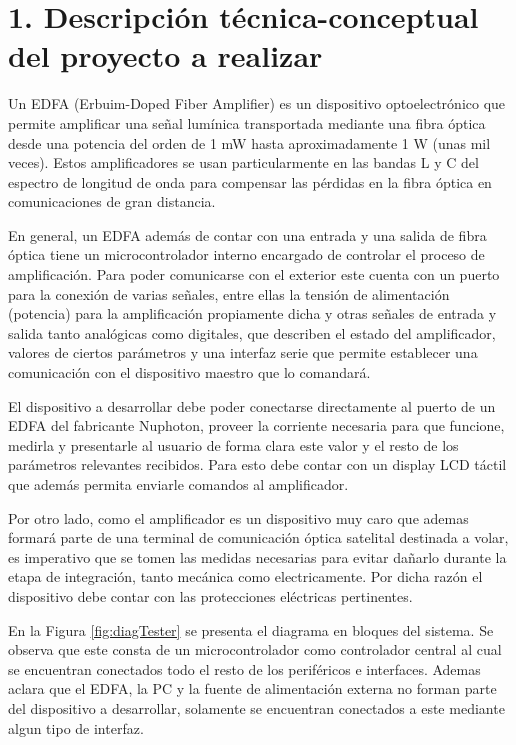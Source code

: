 \documentclass[
11pt, %
]{charter}
\begin{document}
\section{1. Descripción técnica-conceptual del proyecto a realizar}
\label{sec:descripcion}

Un EDFA (Erbuim-Doped Fiber Amplifier) es un dispositivo optoelectrónico que permite amplificar una señal lumínica transportada mediante una fibra óptica desde una potencia del orden de 1 mW hasta aproximadamente 1 W (unas mil veces). Estos amplificadores se usan particularmente en las bandas L y C del espectro de longitud de onda para compensar las pérdidas en la fibra óptica en comunicaciones de gran distancia.

En general, un EDFA además de contar con una entrada y una salida de fibra óptica tiene un microcontrolador interno encargado de controlar el proceso de amplificación. Para poder comunicarse con el exterior este cuenta con un puerto para la conexión de varias señales, entre ellas la tensión de alimentación (potencia) para la amplificación propiamente dicha y otras señales de entrada y salida tanto analógicas como digitales, que describen el estado del amplificador, valores de ciertos parámetros y una interfaz serie que permite establecer una comunicación con el dispositivo maestro que lo comandará.

El dispositivo a desarrollar debe poder conectarse directamente al puerto de un EDFA del fabricante Nuphoton, proveer la corriente necesaria para que funcione, medirla y presentarle al usuario de forma clara este valor y el resto de los parámetros relevantes recibidos. Para esto debe contar con un display LCD táctil que además permita enviarle comandos al amplificador.

Por otro lado, como el amplificador es un dispositivo muy caro que ademas formará parte de una terminal de comunicación óptica satelital destinada a volar, es imperativo que se tomen las medidas necesarias para evitar dañarlo durante la etapa de integración, tanto mecánica como electricamente. Por dicha razón el dispositivo debe contar con las protecciones eléctricas pertinentes.

En la Figura \ref{fig:diagTester} se presenta el diagrama en bloques del sistema. Se observa que este consta de un microcontrolador como controlador central al cual se encuentran conectados todo el resto de los periféricos e interfaces. Ademas aclara que el EDFA, la PC y la fuente de alimentación externa no forman parte del dispositivo a desarrollar, solamente se encuentran conectados a este mediante algun tipo de interfaz.
\end{document}
